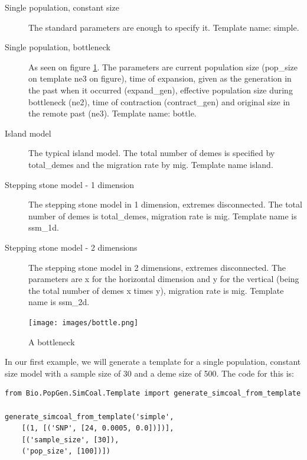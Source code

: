 \documentclass{report}
\begin{document}
\begin{description}
\item[Single population, constant size] The standard parameters are enough to specify
it. Template name: simple.
\item[Single population, bottleneck] As seen on figure \ref{fig:bottle}. The parameters
are current population size (pop\_size on template ne3 on figure), time of expansion,
given as the generation in the past when it occurred (expand\_gen), 
effective population size during bottleneck (ne2), time of contraction
(contract\_gen) and original size in the remote past (ne3). Template name: bottle.
\item[Island model] The typical island model. The total number of demes is specified
by total\_demes and the migration rate by mig. Template name island.
\item[Stepping stone model - 1 dimension] The stepping stone model in 1 dimension,
extremes disconnected. The total number of demes is total\_demes, migration rate
is mig. Template name is ssm\_1d.
\item[Stepping stone model - 2 dimensions] The stepping stone model in 2 dimensions,
extremes disconnected. The parameters are x for the horizontal dimension and y
for the vertical (being the total number of demes x times y), migration rate is mig.
Template name is ssm\_2d.
\end{description}

\begin{htmlonly}
\label{fig:bottle}
\end{htmlonly}

\begin{latexonly}
\begin{figure}[htbp]
\centering
\texttt{[image: images/bottle.png]}
\caption{A bottleneck}
\label{fig:bottle}
\end{figure}
\end{latexonly}

In our first example, we will generate a template for a single population, constant size
model with a sample size of 30 and a deme size of 500. The code for this is:

\begin{verbatim}
from Bio.PopGen.SimCoal.Template import generate_simcoal_from_template

generate_simcoal_from_template('simple',
    [(1, [('SNP', [24, 0.0005, 0.0])])],
    [('sample_size', [30]),
    ('pop_size', [100])])
\end{verbatim}
\end{document}
